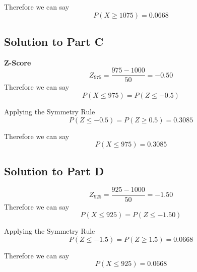 \documentclass[a4paper,12pt]{article}
\begin{document}
\noindent Therefore we can say 
	\[ P(X \geq 1075) = 0.0668 \]
	
\subsection*{Solution to Part C }
\noindent \textbf{Z-Score}	
\[ Z_{975} = \frac{975-1000}{50} = -0.50\]	
Therefore we can say
	\[ P(X \leq 975)  = P(Z \leq -0.5) \]
	
\noindent Applying the Symmetry Rule
	\[ P(Z \leq -0.5) = P(Z \geq 0.5) = 0.3085\]
	
\noindent Therefore we can say 
	\[ P(X \leq 975) = 0.3085 \]
	
\subsection*{Solution to Part D}
\[ Z_{925} = \frac{925-1000}{50} = -1.50\]
Therefore we can say
\[ P(X \leq 925)  = P(Z \leq -1.50) \]
	
\noindent Applying the Symmetry Rule
	\[ P(Z \leq -1.5) = P(Z \geq 1.5) = 0.0668\]
	
\noindent Therefore we can say 
	\[ P(X \leq 925) = 0.0668 \]
	
\end{document}
